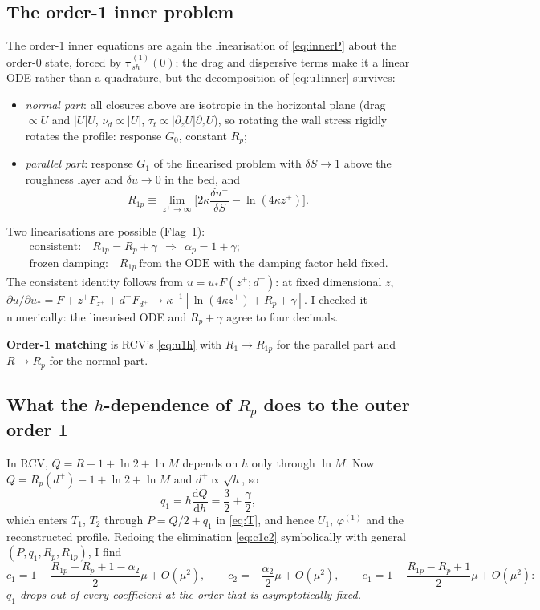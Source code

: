 \documentclass[10pt,a4paper]{article}
\newcommand{\btau}{\bm{\tau}}
\newcommand{\dd}{\mathrm{d}}
\newcommand{\Rp}{R_p}
\newcommand{\Rop}{R_{1p}}
\begin{document}
\subsection{The order-1 inner problem}
The order-1 inner equations are again the linearisation of \eqref{eq:innerP} about the order-0 state, forced by $\btau^{(1)}_{sh}(0)$; the drag and dispersive terms make it a linear ODE rather than a quadrature, but the decomposition of \eqref{eq:u1inner} survives:
\begin{itemize}[nosep]
\item \emph{normal part}: all closures above are isotropic in the horizontal plane (drag $\propto U$ and $|U|U$, $\nu_d\propto|U|$, $\tau_t\propto|\partial_zU|\partial_zU$), so rotating the wall stress rigidly rotates the profile: response $G_0$, constant $\Rp$;
\item \emph{parallel part}: response $G_1$ of the linearised problem with $\delta S\to1$ above the roughness layer and $\delta u\to0$ in the bed, and
\begin{equation}
\Rop\equiv\lim_{z^+\to\infty}\Big[2\kappa\frac{\delta u^+}{\delta S}-\ln(4\kappa z^+)\Big].
\end{equation}
\end{itemize}
Two linearisations are possible (Flag~1):
\begin{equation}\label{eq:R1p}
\begin{gathered}\text{consistent:}\quad \Rop=\Rp+\gamma\ \ \Rightarrow\ \ \alpha_p=1+\gamma;\\
\text{frozen damping:}\quad \Rop\ \text{from the ODE with the damping factor held fixed}.\end{gathered}
\end{equation}
The consistent identity follows from $u=u_*F(z^+;d^+)$: at fixed dimensional $z$, $\partial u/\partial u_*=F+z^+F_{z^+}+d^+F_{d^+}\to\kappa^{-1}[\ln(4\kappa z^+)+\Rp+\gamma]$. I checked it numerically: the linearised ODE and $\Rp+\gamma$ agree to four decimals.

\textbf{Order-1 matching} is RCV's \eqref{eq:u1h} with $R_1\to\Rop$ for the parallel part and $R\to\Rp$ for the normal part.

\subsection{What the $h$-dependence of $\Rp$ does to the outer order 1}
In RCV, $Q=R-1+\ln2+\ln M$ depends on $h$ only through $\ln M$. Now $Q=\Rp(d^+)-1+\ln2+\ln M$ and $d^+\propto\sqrt h$, so
\begin{equation}
q_1=h\frac{\dd Q}{\dd h}=\frac32+\frac\gamma2 ,
\end{equation}
which enters $T_1$, $T_2$ through $P=Q/2+q_1$ in \eqref{eq:T}, and hence $U_1$, $\varphi^{(1)}$ and the reconstructed profile. Redoing the elimination \eqref{eq:c1c2} symbolically with general $(P,q_1,\Rp,\Rop)$, I find
\begin{equation}
c_1=1-\frac{\Rop-\Rp+1-\alpha_2}{2}\mu+O(\mu^2),\qquad c_2=-\frac{\alpha_2}{2}\mu+O(\mu^2),\qquad e_1=1-\frac{\Rop-\Rp+1}{2}\mu+O(\mu^2):
\end{equation}
\emph{$q_1$ drops out of every coefficient at the order that is asymptotically fixed.}
\end{document}
